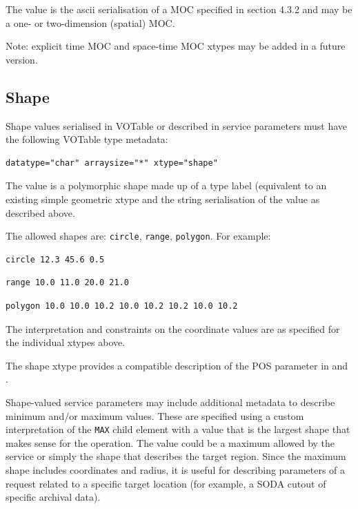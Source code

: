 \documentclass[11pt,letter]{ivoa}
\begin{document}
\noindent
The value is the ascii serialisation of a MOC specified in \citet{2022ivoa.spec.0727F}
section 4.3.2 and may be a one- or two-dimension (spatial) MOC.

Note: explicit time MOC and space-time MOC xtypes may be added in a future version.

\subsection{Shape}
Shape values serialised in VOTable or described in service parameters must have the following VOTable type metadata:

\begin{verbatim}
datatype="char" arraysize="*" xtype="shape"
\end{verbatim}

\noindent
The value is a polymorphic shape made up of a type label (equivalent to an existing simple
geometric xtype and the string serialisation of the value as described above.

The allowed shapes are: \verb|circle|, \verb|range|, \verb|polygon|. For example:

\begin{verbatim}
circle 12.3 45.6 0.5
\end{verbatim}

\begin{verbatim}
range 10.0 11.0 20.0 21.0
\end{verbatim}

\begin{verbatim}
polygon 10.0 10.0 10.2 10.0 10.2 10.2 10.0 10.2
\end{verbatim}

The interpretation and constraints on the coordinate values are as specified
for the individual xtypes above.

The shape xtype provides a compatible description of the POS parameter in
\citep{2015ivoa.spec.1223D} and \citep{2017ivoa.spec.0517B}.

Shape-valued service parameters may include additional metadata to describe minimum
and/or maximum values. These are specified using a custom interpretation of the
\verb|MAX| child element with a value that is the largest shape that makes sense
for the operation. The value could be a maximum allowed by the service or simply
the shape that describes the target region. Since the maximum shape includes
coordinates and radius, it is useful for describing parameters of a request related
to a specific target location (for example, a SODA cutout of specific archival data).
\end{document}
